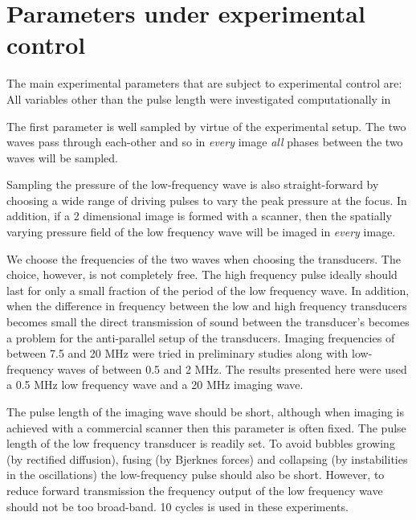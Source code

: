 \section{Parameters under experimental control}

 The main experimental parameters that are 
 subject to experimental control are:
 All variables other than the pulse length were investigated computationally in  


 The first parameter is well sampled by  virtue of the experimental
 setup.
 The two waves pass through each-other and so in {\em every} image {\em
   all}
 phases between the two waves will be sampled.

 Sampling the pressure of the low-frequency wave is also
 straight-forward by choosing a wide range of driving pulses to vary the peak pressure
 at the focus.
 In addition, if a 2 dimensional  image is formed with a scanner,
then the spatially varying pressure field of the low frequency wave 
 will be imaged in  {\em every } image.


We choose the frequencies of the two waves when choosing the transducers.
 The choice, however, is not completely free.
 The high frequency pulse ideally should last for only a small fraction
 of the period of the low frequency wave.
 In addition, 
 when the difference in frequency between the low and high frequency transducers
 becomes small the direct transmission of sound between the transducer's
 becomes a problem for the anti-parallel setup of the transducers.
 Imaging frequencies of between 7.5 and 20 MHz were tried in preliminary studies
 along with low-frequency waves of between 0.5 and 2 MHz.
 The results presented here were used a 0.5 MHz low frequency wave and
 a 20 MHz imaging wave. %

 The pulse length of the imaging wave should be short, 
 although when imaging is achieved with a commercial scanner %
 then this parameter is often fixed.
 The pulse length of the low frequency transducer is readily set.
 To avoid bubbles growing (by rectified diffusion), fusing (by Bjerknes
 forces) and collapsing (by instabilities in the oscillations) the low-frequency
 pulse should also be short.
 However, to reduce forward transmission the  frequency output of the
 low frequency wave should not be 
 too broad-band.
 10 cycles is used in these experiments.


